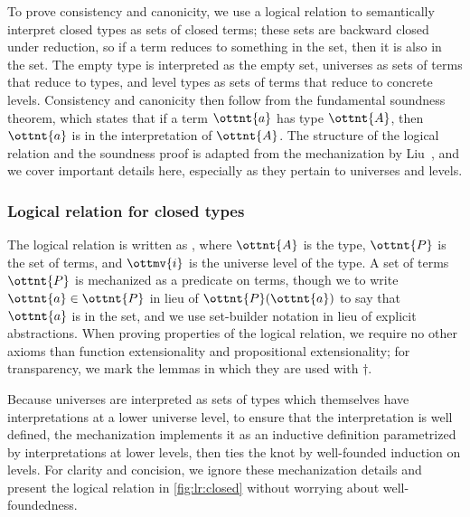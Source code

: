 \documentclass[a4paper,UKenglish,cleveref,autoref,thm-restate]{lipics-v2021}
\newcommand{\citep}[1]{\cite{#1}}
\begin{document}
To prove consistency and canonicity,
we use a logical relation to semantically interpret closed types as sets of closed terms;
these sets are backward closed under reduction,
so if a term reduces to something in the set, then it is also in the set.
The empty type is interpreted as the empty set,
universes as sets of terms that reduce to types,
and level types as sets of terms that reduce to concrete levels.
Consistency and canonicity then follow from the fundamental soundness theorem,
which states that if a term $\ottnt{a}$ has type $\ottnt{A}$,
then $\ottnt{a}$ is in the interpretation of $\ottnt{A}$.
The structure of the logical relation and the soundness proof
is adapted from the mechanization by Liu~\citep{lr-pearl},
and we cover important details here,
especially as they pertain to universes and levels.

\subsubsection{Logical relation for closed types}

The logical relation is written as ,
where $\ottnt{A}$ is the type, $\ottnt{P}$ is the set of terms,
and $\ottmv{i}$ is the universe level of the type.
A set of terms $\ottnt{P}$ is mechanized as a predicate on terms,
though we to write $ \ottnt{a}  \in  \ottnt{P} $ in lieu of $\ottnt{P}(\ottnt{a})$
to say that $\ottnt{a}$ is in the set,
and we use set-builder notation in lieu of explicit abstractions.
When proving properties of the logical relation,
we require no other axioms than function extensionality and propositional extensionality;
for transparency, we mark the lemmas in which they are used with $\dagger$.

Because universes are interpreted as sets of types
which themselves have interpretations at a lower universe level,
to ensure that the interpretation is well defined,
the mechanization implements it as an inductive definition
parametrized by interpretations at lower levels,
then ties the knot by well-founded induction on levels.
For clarity and concision, we ignore these mechanization details
and present the logical relation in \cref{fig:lr:closed}
without worrying about well-foundedness.
\end{document}
